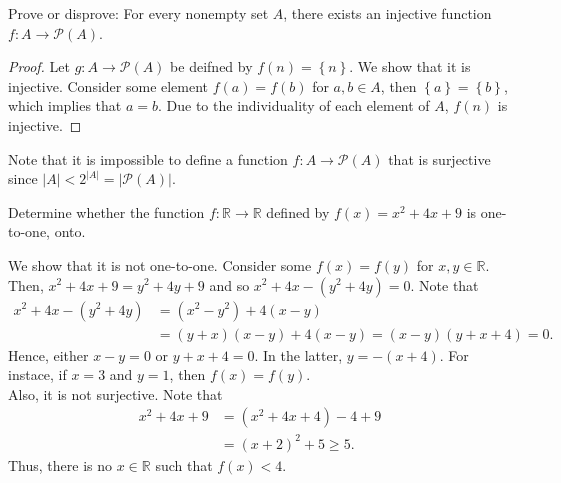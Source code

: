 \documentclass[12pt]{article}
\newcommand{\R}{\mathbb{R}}
\newenvironment{problem}[2][Problem]{\begin{trivlist} \item[\hskip \labelsep {\bfseries #1}\hskip \labelsep {\bfseries #2.}]}{\end{trivlist}}
\newenvironment{solution}[1][Solution]{\begin{trivlist} \item[\hskip \labelsep {\bfseries #1}]}{\end{trivlist}}
\begin{document}
    \begin{problem}{23}
      Prove or disprove: For every nonempty set $A$, there exists an injective function $f:A\to \mathcal{P}(A)$.
      \begin{proof}
	Let $g:A\to \mathcal{P}(A)$ be deifned by $f(n)=\left\{ n \right\}$. We show that it is injective. Consider some element $f(a)=f(b)$ for $a,b\in A$, then $\left\{ a \right\}=\left\{ b \right\}$, which implies that $a=b$. Due to the individuality of each element of $A$, $f(n)$ is injective.	
    \end{proof}
    Note that it is impossible to define a function $f:A\to \mathcal{P}(A)$ that is surjective since $|A|<2^{|A|} = |\mathcal{P}(A)|$. 
    \end{problem}
    \begin{problem}{24}
      Determine whether the function $f:\R\to \R$ defined by $f(x)=x^{2}+4x+9$ is one-to-one, onto.
    \begin{solution}
      We show that it is not one-to-one. Consider some $f(x)=f(y)$ for $x,y\in \R$. Then, $x^{2}+4x+9 = y^{2}+4y+9$ and so $x^{2}+4x - (y^{2}+4y)=0$. Note that  
    \begin{align*}
      x^{2}+4x-(y^{2}+4y) &= (x^{2}-y^{2})+4(x-y)\\
      &= (y+x)(x-y)+4(x-y) = (x-y)(y+x+4) = 0.
    \end{align*}
    Hence, either $x-y=0$ or $y+x+4=0$. In the latter, $y=-(x+4)$. For instace, if $x=3$ and $y=1$, then $f(x)=f(y)$.\\
    Also, it is not surjective. Note that   
    \begin{align*}
    x^{2}+4x+9 &= \left(x^{2}+4x+4\right)-4+9\\
    &= \left(x+2\right)^{2}+5\geq 5.
    \end{align*}
    Thus, there is no $x\in \R$ such that $f(x)<4$.

    \end{solution}
    \end{problem}
\end{document}
